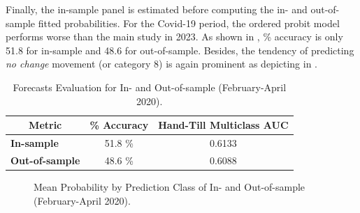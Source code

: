 Finally, the in-sample panel is estimated before computing the in- and out-of-sample fitted probabilities. For the Covid-19 period, the ordered probit model performs worse than the main study in 2023. As shown in , \% accuracy is only 51.8 for in-sample and 48.6 for out-of-sample. Besides, the tendency of predicting \textit{no change} movement (or category 8) is again prominent as depicting in .


\begin{table}[H]
\centering
\begin{tabular}{@{}lcc@{}}
\toprule
\multicolumn{1}{c}{Metric} & \multicolumn{1}{l}{\textbf{\% Accuracy}} & \multicolumn{1}{l}{\textbf{Hand-Till Multiclass AUC}} \\ \midrule
\textbf{In-sample}         & 51.8 \%                                 & 0.6133                                                \\
\textbf{Out-of-sample}     & 48.6 \%                                 & 0.6088                                                \\ \bottomrule
\end{tabular}
\caption{Forecasts Evaluation for In- and Out-of-sample (February-April 2020).}
\label{tab:table-20}
\end{table}



\begin{figure}[H]
    \centering
    \caption{Mean Probability by Prediction Class of In- and Out-of-sample (February-April 2020).}
    \label{fig:figure-6}
\end{figure}




